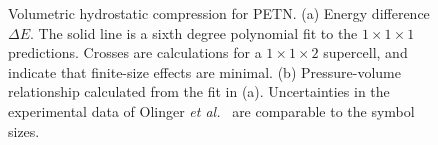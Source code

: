 \documentclass[prb,aps,nobibnotes,twocolumn,doublespace,twocolumngrid,superbib]{revtex4}
\begin{document}
\begin{figure}
\caption{Volumetric hydrostatic compression for PETN.
(a) Energy difference $\Delta E$. The solid line is a sixth degree
polynomial fit to the $1\times 1\times 1$ predictions.  Crosses are
calculations for a $1\times 1\times 2$ supercell, and indicate that
finite-size effects are minimal.  (b) Pressure-volume relationship
calculated from the fit in (a).  Uncertainties in the experimental
data of Olinger {\it et al.}~\cite{Olinger_1975v62} are comparable to 
the symbol sizes.  }
\label{fig:volume_compress}
\end{figure}
\end{document}
